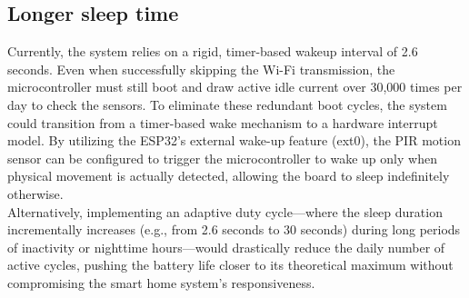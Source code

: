 \documentclass[12pt]{article}
\begin{document}
\subsection{Longer sleep time}
Currently, the system relies on a rigid, timer-based wakeup interval of 2.6 seconds. Even when successfully skipping the Wi-Fi transmission, the microcontroller must still boot and draw active idle current over 30,000 times per day to check the sensors. To eliminate these redundant boot cycles, the system could transition from a timer-based wake mechanism to a hardware interrupt model. By utilizing the ESP32's external wake-up feature (ext0), the PIR motion sensor can be configured to trigger the microcontroller to wake up only when physical movement is actually detected, allowing the board to sleep indefinitely otherwise.\\
Alternatively, implementing an adaptive duty cycle—where the sleep duration incrementally increases (e.g., from 2.6 seconds to 30 seconds) during long periods of inactivity or nighttime hours—would drastically reduce the daily number of active cycles, pushing the battery life closer to its theoretical maximum without compromising the smart home system's responsiveness.
\end{document}
